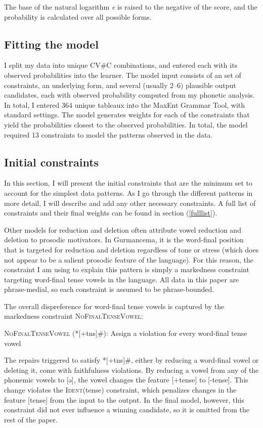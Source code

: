 \documentclass[output=paper,newtxmath,modfonts,nonflat,draftmode]{langsci/langscibook}
\begin{document}
The base of the natural logarithm \textit{e} is raised to the negative of the score, and the probability is calculated over all possible forms. 

\subsection{Fitting the model}

I split my data into unique CV\#C combinations, and entered each with its observed probabilities into the learner. The model input consists of an set of constraints, an underlying form, and several (usually 2--6) plausible output candidates, each with observed probability computed from my phonetic analysis. In total, I entered 364 unique tableaux into the MaxEnt Grammar Tool, with standard settings. The model generates weights for each of the constraints that yield the probabilities closest to the observed probabilities. In total, the model required 13 constraints to model the patterns observed in the data. 

\subsection{Initial constraints}
In this section, I will present the initial constraints that are the minimum set to account for the simplest data patterns. As I go through the different patterns in more detail, I will describe and add any other necessary constraints. A full list of constraints and their final weights can be found in section (\ref{fulllist}). 

Other models for reduction and deletion often attribute vowel reduction and deletion to prosodic motivators. In Gurmancema, it is the word-final position that is targeted for reduction and deletion regardless of tone or stress (which does not appear to be a salient prosodic feature of the language). For this reason, the constraint I am using to explain this pattern is simply a markedness constraint targeting word-final tense vowels in the language. All data in this paper are phrase-medial, so each constraint is assumed to be phrase-bounded. 

The overall dispreference for word-final tense vowels is captured by the 
markedness constraint \textsc{NoFinalTenseVowel}:

\ea
\textsc{NoFinalTenseVowel} (*[+tns]\#): Assign a violation for every word-final 	tense vowel
\z

The repairs triggered to satisfy *[+tns]\#, either by reducing a word-final vowel or deleting it, come with faithfulness violations. By reducing a vowel from any of the phonemic vowels to [ə], the vowel changes the feature [+tense] to [-tense]. This change violates the \textsc{Ident}(tense) constraint, which penalizes changes in the feature [tense] from the input to the output. In the final model, however, this constraint did not ever influence a winning candidate, so it is omitted from the rest of the paper.
\end{document}
